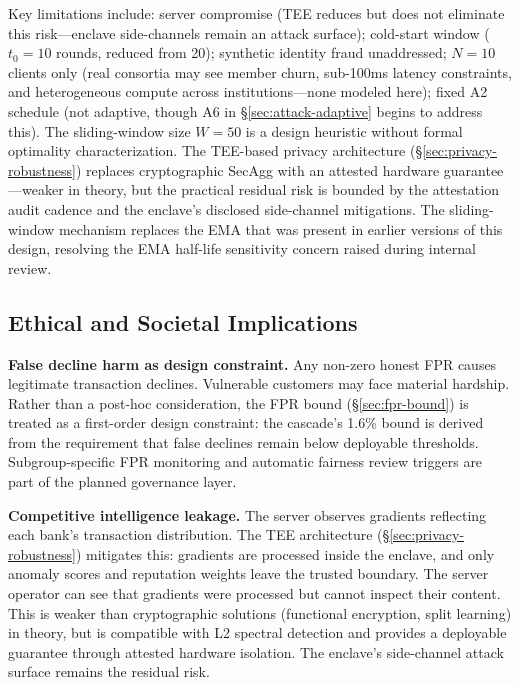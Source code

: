 \documentclass[10pt,journal]{IEEEtran}
\begin{document}
Key limitations include: server compromise (TEE reduces but does not eliminate this risk---enclave side-channels remain an attack surface); cold-start window ($t_0=10$ rounds, reduced from 20); synthetic identity fraud unaddressed; $N=10$ clients only (real consortia may see member churn, sub-100ms latency constraints, and heterogeneous compute across institutions---none modeled here); fixed A2 schedule (not adaptive, though A6 in \S\ref{sec:attack-adaptive} begins to address this). The sliding-window size $W=50$ is a design heuristic without formal optimality characterization. The TEE-based privacy architecture (\S\ref{sec:privacy-robustness}) replaces cryptographic SecAgg with an attested hardware guarantee---weaker in theory, but the practical residual risk is bounded by the attestation audit cadence and the enclave's disclosed side-channel mitigations. The sliding-window mechanism replaces the EMA that was present in earlier versions of this design, resolving the EMA half-life sensitivity concern raised during internal review.

\subsection{Ethical and Societal Implications}

\textbf{False decline harm as design constraint.} Any non-zero honest FPR causes legitimate transaction declines. Vulnerable customers may face material hardship. Rather than a post-hoc consideration, the FPR bound (\S\ref{sec:fpr-bound}) is treated as a first-order design constraint: the cascade's 1.6\% bound is derived from the requirement that false declines remain below deployable thresholds. Subgroup-specific FPR monitoring and automatic fairness review triggers are part of the planned governance layer.

\textbf{Competitive intelligence leakage.} The server observes gradients reflecting each bank's transaction distribution. The TEE architecture (\S\ref{sec:privacy-robustness}) mitigates this: gradients are processed inside the enclave, and only anomaly scores and reputation weights leave the trusted boundary. The server operator can see that gradients were processed but cannot inspect their content. This is weaker than cryptographic solutions (functional encryption, split learning) in theory, but is compatible with L2 spectral detection and provides a deployable guarantee through attested hardware isolation. The enclave's side-channel attack surface remains the residual risk.
\end{document}
